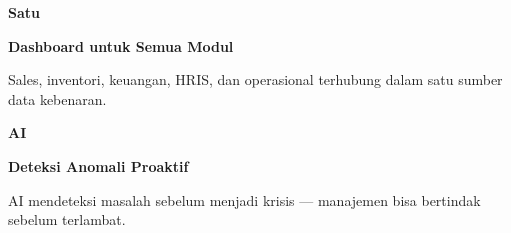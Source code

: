 \documentclass[a4paper]{article}
\begin{document}
\begin{minipage}[t]{0.485\textwidth}
    \noindent\colorbox{BlueBg}{%
        \begin{minipage}[t][2.7cm][c]{\dimexpr\linewidth-2\fboxsep\relax}
            \centering
            {\fontsize{20}{24}\selectfont\bfseries\color{IndigoPrimary} Satu}\par\vspace{2pt}
            {\fontsize{9.5}{12}\selectfont\bfseries\color{BlueDark} Dashboard untuk Semua Modul}\par\vspace{2pt}
            {\fontsize{8.5}{11}\selectfont\color{TextDark}Sales, inventori, keuangan, HRIS, dan operasional terhubung dalam satu sumber data kebenaran.}
        \end{minipage}}\par
    \vspace{6pt}
    \noindent\colorbox{BlueBg}{%
        \begin{minipage}[t][2.7cm][c]{\dimexpr\linewidth-2\fboxsep\relax}
            \centering
            {\fontsize{20}{24}\selectfont\bfseries\color{IndigoPrimary} AI}\par\vspace{2pt}
            {\fontsize{9.5}{12}\selectfont\bfseries\color{BlueDark} Deteksi Anomali Proaktif}\par\vspace{2pt}
            {\fontsize{8.5}{11}\selectfont\color{TextDark}AI mendeteksi masalah sebelum menjadi krisis --- manajemen bisa bertindak sebelum terlambat.}
        \end{minipage}}%
\end{minipage}

\vspace{8pt}
\end{document}

